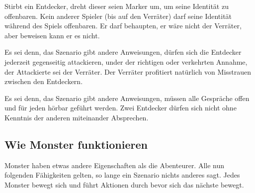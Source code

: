 Stirbt ein Entdecker, dreht dieser seien Marker um, um seine Identität zu offenbaren. Kein anderer Spieler (bis auf den Verräter) darf seine Identität während des Spiels offenbaren. Er darf behaupten, er wäre nicht der Verräter, aber beweisen kann er es nicht.

Es sei denn, das Szenario gibt andere Anweisungen, dürfen sich die Entdecker jederzeit gegenseitig attackieren, under der richtigen oder verkehrten Annahme, der Attackierte sei der Verräter. Der Verräter profitiert natürlich von Misstrauen zwischen den Entdeckern.

Es sei denn, das Szenario gibt andere Anweisungen, müssen alle Gespräche offen und für jeden hörbar geführt werden. Zwei Entdecker dürfen sich nicht ohne Kenntnis der anderen miteinander Absprechen.

\subsection{Wie Monster funktionieren}
\label{kap:rules:monsters}

Monster haben etwas andere Eigenschaften als die Abenteurer. Alle nun folgenden Fähigkeiten gelten, so lange ein Szenario nichts anderes sagt. Jedes Monster bewegt sich und führt Aktionen durch bevor sich das nächste bewegt.

